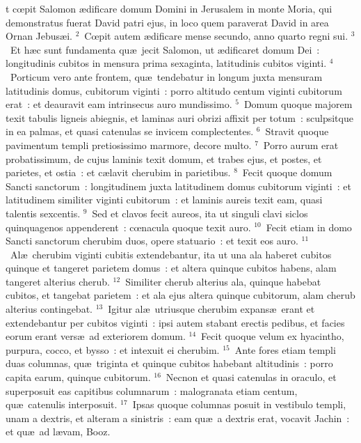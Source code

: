 \bchapter
{}t cœpit Salomon \ae dificare domum Domini in Jerusalem in monte Moria, qui demonstratus fuerat David patri ejus, in loco quem paraverat David in area Ornan Jebus\ae i.
${}^{2}$~Cœpit autem \ae dificare mense secundo, anno quarto regni sui.
${}^{3}$~Et h\ae c sunt fundamenta qu\ae\ jecit Salomon, ut \ae dificaret domum Dei~: longitudinis cubitos in mensura prima sexaginta, latitudinis cubitos viginti.
${}^{4}$~Porticum vero ante frontem, qu\ae\ tendebatur in longum juxta mensuram latitudinis domus, cubitorum viginti~: porro altitudo centum viginti cubitorum erat~: et deauravit eam intrinsecus auro mundissimo.
${}^{5}$~Domum quoque majorem texit tabulis ligneis abiegnis, et laminas auri obrizi affixit per totum~: sculpsitque in ea palmas, et quasi catenulas se invicem complectentes.
${}^{6}$~Stravit quoque pavimentum templi pretiosissimo marmore, decore multo.
${}^{7}$~Porro aurum erat probatissimum, de cujus laminis texit domum, et trabes ejus, et postes, et parietes, et ostia~: et c\ae lavit cherubim in parietibus.
${}^{8}$~Fecit quoque domum Sancti sanctorum~: longitudinem juxta latitudinem domus cubitorum viginti~: et latitudinem similiter viginti cubitorum~: et laminis aureis texit eam, quasi talentis sexcentis.
${}^{9}$~Sed et clavos fecit aureos, ita ut singuli clavi siclos quinquagenos appenderent~: cœnacula quoque texit auro.
${}^{10}$~Fecit etiam in domo Sancti sanctorum cherubim duos, opere statuario~: et texit eos auro.
${}^{11}$~Al\ae\ cherubim viginti cubitis extendebantur, ita ut una ala haberet cubitos quinque et tangeret parietem domus~: et altera quinque cubitos habens, alam tangeret alterius cherub.
${}^{12}$~Similiter cherub alterius ala, quinque habebat cubitos, et tangebat parietem~: et ala ejus altera quinque cubitorum, alam cherub alterius contingebat.
${}^{13}$~Igitur al\ae\ utriusque cherubim expans\ae\ erant et extendebantur per cubitos viginti~: ipsi autem stabant erectis pedibus, et facies eorum erant vers\ae\ ad exteriorem domum.
${}^{14}$~Fecit quoque velum ex hyacintho, purpura, cocco, et bysso~: et intexuit ei cherubim.
${}^{15}$~Ante fores etiam templi duas columnas, qu\ae\ triginta et quinque cubitos habebant altitudinis~: porro capita earum, quinque cubitorum.
${}^{16}$~Necnon et quasi catenulas in oraculo, et superposuit eas capitibus columnarum~: malogranata etiam centum, qu\ae\ catenulis interposuit.
${}^{17}$~Ipsas quoque columnas posuit in vestibulo templi, unam a dextris, et alteram a sinistris~: eam qu\ae\ a dextris erat, vocavit Jachin~: et qu\ae\ ad l\ae vam, Booz.

